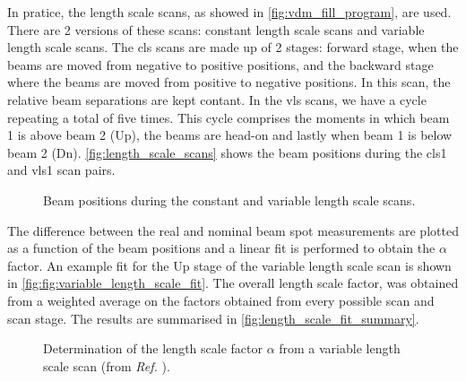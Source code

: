 In pratice, the length scale scans, as showed in \autoref{fig:vdm_fill_program}, are used. There are 2 versions of these scans: constant length scale scans and variable length scale scans. The cls scans are made up of 2 stages: forward stage, when the beams are moved from negative to positive positions, and the backward stage where the beams are moved from positive to negative positions. In this scan, the relative beam separations are kept contant. In the vls scans, we have a cycle repeating a total of five times. This cycle comprises the moments in which beam 1 is above beam 2 (Up), the beams are head-on and lastly when beam 1 is below beam 2 (Dn). \autoref{fig:length_scale_scans} shows the beam positions during the cls1 and vls1 scan pairs.

\begin{figure}[!htb]
	\centering
	\caption{Beam positions during the constant and variable length scale scans.}
	\label{fig:length_scale_scans}
\end{figure}

The difference between the real and nominal beam spot measurements are plotted as a function of the beam positions and a linear fit is performed to obtain the $\alpha$ factor. An example fit for the Up stage of the variable length scale scan is shown in \autoref{fig:fig:variable_length_scale_fit}. The overall length scale factor, was obtained from a weighted average on the factors obtained from every possible scan and scan stage. The results are summarised in \autoref{fig:length_scale_fit_summary}.

\begin{figure}[!htb]
	\centering
	\caption{Determination of the length scale factor $\alpha$ from a variable length scale scan (from \textit{Ref.} \cite{CMS-DP-2024-068}).}
	\label{fig:fig:variable_length_scale_fit}
\end{figure}

